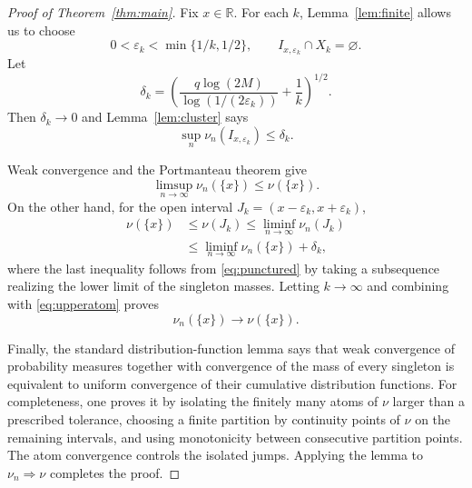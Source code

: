 \documentclass[11pt]{article}
\theoremstyle{definition}
\theoremstyle{remark}
\newcommand{\R}{\mathbb{R}}
\begin{document}
\begin{proof}[Proof of Theorem~\ref{thm:main}]
Fix $x\in\R$.  For each $k$, Lemma~\ref{lem:finite} allows us to choose
\[
  0<\varepsilon_k<\min\{1/k,1/2\},
  \qquad
  I_{x,\varepsilon_k}\cap X_k=\varnothing .
\]
Let
\[
 \delta_k=
 \left(
 \frac{q\log(2M)}{\log(1/(2\varepsilon_k))}+\frac1k
 \right)^{1/2}.
\]
Then $\delta_k\to0$ and Lemma~\ref{lem:cluster} says
\[
          \sup_n\nu_n(I_{x,\varepsilon_k})\le\delta_k.
\tag{5}\label{eq:punctured}
\]

Weak convergence and the Portmanteau theorem give
\[
 \limsup_{n\to\infty}\nu_n(\{x\})\le\nu(\{x\}).
\tag{6}\label{eq:upperatom}
\]
On the other hand, for the open interval
$J_k=(x-\varepsilon_k,x+\varepsilon_k)$,
\[
\begin{aligned}
\nu(\{x\})
&\le \nu(J_k)
 \le \liminf_{n\to\infty}\nu_n(J_k)\\
&\le \liminf_{n\to\infty}\nu_n(\{x\})+\delta_k,
\end{aligned}
\]
where the last inequality follows from \eqref{eq:punctured} by taking a
subsequence realizing the lower limit of the singleton masses.  Letting
$k\to\infty$ and combining with \eqref{eq:upperatom} proves
\[
                    \nu_n(\{x\})\longrightarrow\nu(\{x\}).
\]

Finally, the standard distribution-function lemma says that weak convergence
of probability measures together with convergence of the mass of every
singleton is equivalent to uniform convergence of their cumulative
distribution functions.  For completeness, one proves it by isolating the
finitely many atoms of $\nu$ larger than a prescribed tolerance, choosing a
finite partition by continuity points of $\nu$ on the remaining intervals,
and using monotonicity between consecutive partition points.  The atom
convergence controls the isolated jumps.  Applying the lemma to
$\nu_n\Rightarrow\nu$ completes the proof.
\end{proof}
\end{document}

